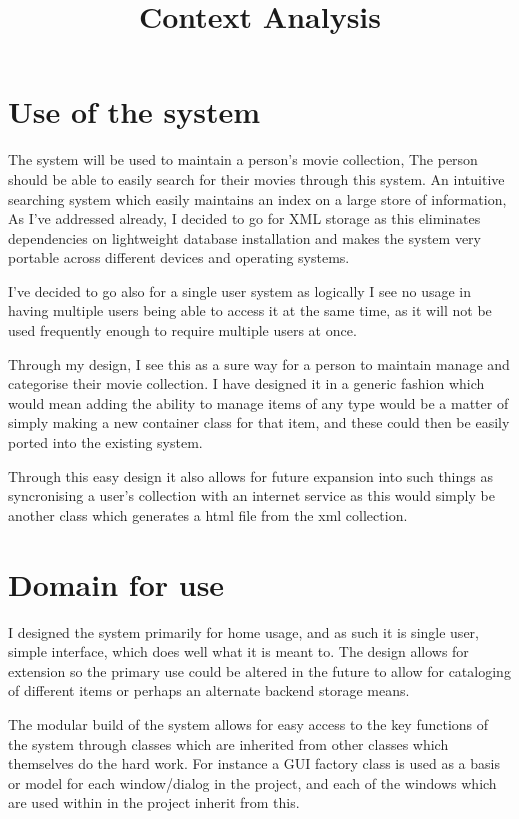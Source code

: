 \documentclass{article}
\title{ Context Analysis}
\begin{document}
\section*{ Use of the system}


The system will be used to maintain a person's movie collection, The person should be able to easily search for their movies through this system. An intuitive searching system which easily maintains an index on a large store of information, As I've addressed already, I decided to go for XML storage as this eliminates dependencies on lightweight database installation and makes the system very portable across different devices and operating systems.



I've decided to go also for a single user system as logically I see no usage in having multiple users being able to access it at the same time, as it will not be used frequently enough to require multiple users at once.



Through my design, I see this as a sure way for a person to maintain manage and categorise their movie collection. I have designed it in a generic fashion which would mean adding the ability to manage items of any type would be a matter of simply making a new container class for that item, and these could then be easily ported into the existing system.



Through this easy design it also allows for future expansion into such things as syncronising a user's collection with an internet service as this would simply be another class which generates a html file from the xml collection.



\section*{ Domain for use}


I designed the system primarily for home usage, and as such it is single user, simple interface, which does well what it is meant to. The design allows for extension so the primary use could be altered in the future to allow for cataloging of different items or perhaps an alternate backend storage means.



The modular build of the system allows for easy access to the key functions of the system through classes which are inherited from other classes which themselves do the hard work. For instance a GUI factory class is used as a basis or model for each window/dialog in the project, and each of the windows which are used within in the project inherit from this.
\end{document}
